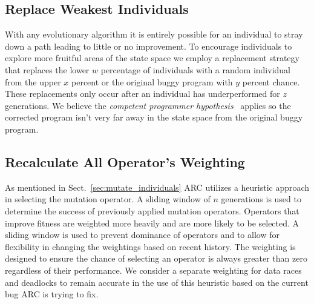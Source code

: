 \subsection{Replace Weakest Individuals}
\label{sec:replace_weakest_individuals}

With any evolutionary algorithm it is entirely possible for an individual to
stray down a path leading to little or no improvement. To encourage individuals
to explore more fruitful areas of the state space we employ a replacement
strategy that replaces the lower $w$ percentage of individuals with a random
individual from the upper $x$ percent or the original buggy program with $y$
percent chance. These replacements only occur after an individual has
underperformed for $z$ generations. We believe the \textit{competent programmer
hypothesis}~\cite{ABD+79} applies so the corrected program isn't very far away
in the state space from the original buggy program.

\subsection{Recalculate All Operator's Weighting}
\label{sec:recalculate_operator_weighting}

As mentioned in Sect.~\ref{sec:mutate_individuals} ARC utilizes a heuristic
approach in selecting the mutation operator. A sliding window of $n$
generations is used to determine the success of previously applied mutation
operators. Operators that improve fitness are weighted more heavily and are
more likely to be selected. A sliding window is used to prevent dominance of
operators and to allow for flexibility in changing the weightings based on
recent history. The weighting is designed to ensure the chance of selecting an
operator is always greater than zero regardless of their performance.
We consider a separate weighting for data races and deadlocks to remain
accurate in the use of this heuristic based on the current bug ARC is trying to
fix.
